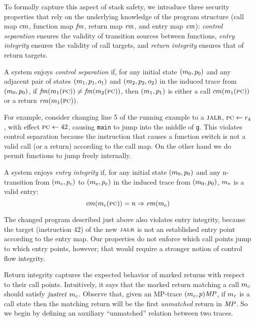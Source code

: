 \documentclass[acmsmall,review,anonymous]{acmart}\settopmatter{printfolios=true,printccs=false,printacmref=false}
\begin{document}
{To formally capture this aspect of stack safety, we introduce three
security properties that rely on the underlying knowledge of the
program structure (call map $cm$, function map $\mathit{fm}$, return map $\mathit{rm}$, and entry
map $\mathit{em}$): {\em control separation} ensures the validity of transition
sources between functions, {\em entry integrity} ensures the validity
of call targets, and {\em return integrity} ensures that of
return targets.

A system enjoys {\em control separation}
if, for any initial state \((m_0, p_0)\) and any adjacent pair of states
\((m_1,p_1,o_1)\) and \((m_2,p_2,o_2)\)
in the induced trace from \((m_0,p_0)\),
if \(\mathit{fm}(m_1(\textsc{pc})) \not = \mathit{fm}(m_2(\textsc{pc}))\),
then \((m_1,p_1)\) is either a call \(cm(m_1(\textsc{pc}))\)
or a return \(\mathit{rm}(m_1(\textsc{pc}))\).

\smallskip

For example, consider changing line 5 of the running example to a $\textsc{jalr}$,
$\textsc{pc} \leftarrow r_4$, with effect $\textsc{pc} \leftarrow 42$, causing {\tt main}
to jump into the middle of {\tt g}.
This violates control separation because the instruction that causes a
function switch is not a valid call (or a return) according to the
call map. On the other hand we do permit functions to jump freely internally.

A system enjoys {\em entry integrity}
if, for any initial state \((m_0, p_0)\)
and any n-transition from \((m_c,p_c)\) to
\((m_e, p_e)\) in the induced trace from
\((m_0,p_0)\), $m_e$ is a valid entry:
\[cm(m_c(\textsc{pc})) = n \Rightarrow \mathit{em}(m_e)\]

The changed program described just above also violates entry integrity,
because the target (instruction 42) of the new $\textsc{jalr}$ is not an established
entry point according to the entry map. Our properties do not enforce which
call points jump to which entry points, however; that would require a stronger
notion of control flow integrity.

\newcommand*{\Unmatched}{\mathit{um}}

Return integrity captures the expected behavior of marked returns with
respect to their call points. Intuitively, it says that the marked return
matching a call $m_c$ should satisfy $\mathit{justret}\ m_c$.
Observe that, given an MP-trace $(m_c,p)\mathit{MP}$, if $m_c$ is
a call state then the matching return will be the first \emph{unmatched} return
in $\mathit{MP}$. So we begin by defining an auxiliary ``unmatched'' relation between
two traces.

}
\end{document}
